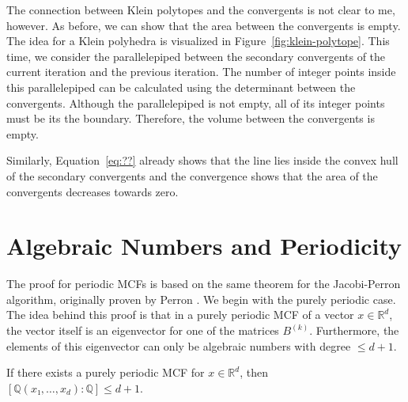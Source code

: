The connection between Klein polytopes and the convergents is not clear to me, however.
As before, we can show that the area between the convergents is empty.
The idea for a Klein polyhedra is visualized in Figure~\ref{fig:klein-polytope}.
This time, we consider the parallelepiped between the secondary convergents of the
current iteration and the previous iteration.
The number of integer points inside this parallelepiped can be calculated using
the determinant between the convergents.
Although the parallelepiped is not empty,
all of its integer points must be its the boundary.
Therefore, the volume between the convergents is empty.

Similarly,
Equation~\ref{eq:??} already shows that the line lies inside the convex hull of
the secondary convergents
and the convergence shows that the area of the convergents decreases towards zero.
\fi

\section{Algebraic Numbers and Periodicity}

The proof for periodic MCFs is based on the same theorem for the Jacobi-Perron
algorithm, originally proven by Perron \cite{Perron07}.
We begin with the purely periodic case.
The idea behind this proof is that in a purely periodic MCF of a vector $x ∈ ℝ^d$,
the vector itself is an eigenvector for one of the matrices $B^{(k)}$.
Furthermore, the elements of this eigenvector can only be algebraic numbers with degree $≤ d+1$.

\begin{lemma}
  \label{lem:mdcf-purely-periodic}
  If there exists a purely periodic MCF for $x ∈ ℝ^d$,
  then $[ℚ(x₁, …, x_d) : ℚ] ≤ d+1$.
\end{lemma}

